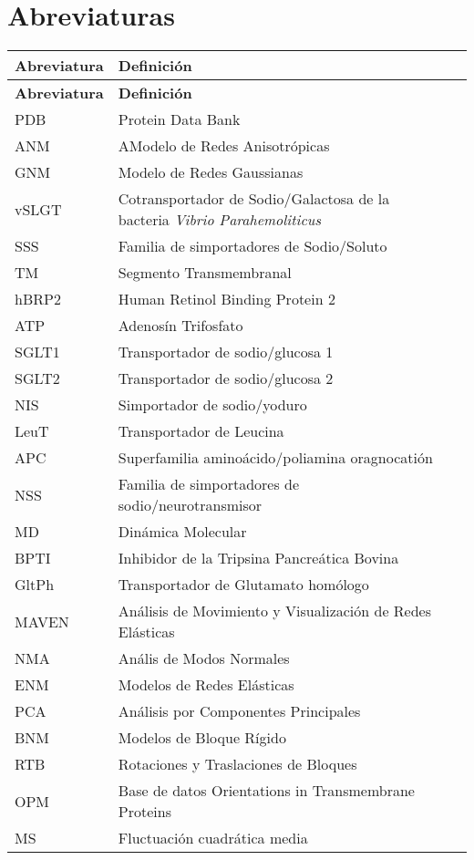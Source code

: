 \section*{Abreviaturas}
\begin{longtable}[l]{lll}\hline
   \textbf{Abreviatura} & \textbf{Definici\'{o}n} \\
 \hline%
  \endfirsthead%
 \textbf{Abreviatura} & \textbf{Definici\'{o}n} \\
  \hline%
 \endhead%
\renewcommand{\arraystretch}{1.4}\label{abre}
PDB&Protein Data Bank\\
ANM&AModelo de Redes Anisotr\'{o}picas\\
GNM&Modelo de Redes Gaussianas\\
vSLGT&Cotransportador de Sodio/Galactosa de la bacteria \textit{Vibrio Parahemoliticus}\\
SSS&Familia de simportadores de Sodio/Soluto\\
TM&Segmento Transmembranal\\ 
hBRP2&Human Retinol Binding Protein 2\\
ATP&Adenos\'{i}n Trifosfato\\
SGLT1&Transportador de sodio/glucosa 1\\
SGLT2&Transportador de sodio/glucosa 2\\
NIS&Simportador de sodio/yoduro\\
LeuT&Transportador de Leucina\\
APC&Superfamilia amino\'{a}cido/poliamina oragnocati\'{o}n\\
NSS&Familia de simportadores de sodio/neurotransmisor \\
MD& Din\'{a}mica Molecular\\
BPTI&Inhibidor de la Tripsina Pancre\'{a}tica Bovina\\
GltPh&Transportador de Glutamato hom\'{o}logo\\
MAVEN& An\'{a}lisis de Movimiento y Visualizaci\'{o}n de Redes El\'{a}sticas\\
NMA&An\'{a}lis de Modos Normales\\
ENM&Modelos de Redes El\'{a}sticas\\
PCA&An\'{a}lisis por Componentes Principales\\
BNM&Modelos de Bloque R\'{i}gido\\
RTB&Rotaciones y Traslaciones de Bloques\\
OPM&Base de datos Orientations in Transmembrane Proteins\\
MS&Fluctuaci\'{o}n cuadr\'{a}tica media\\
\hline
\end{longtable}
